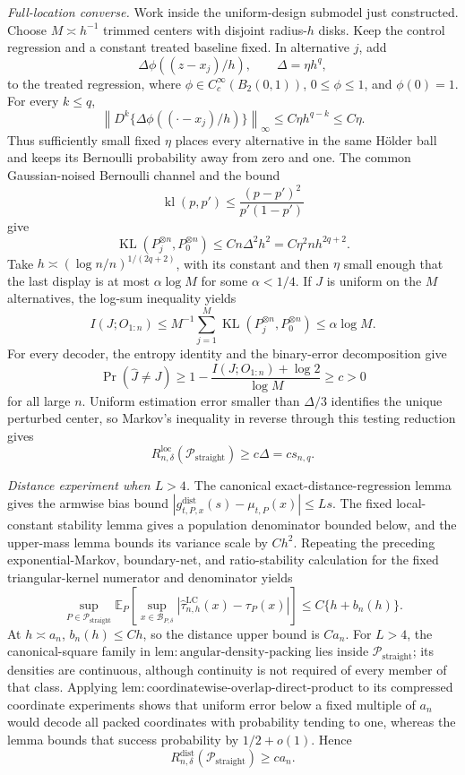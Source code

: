 \emph{Full-location converse.}  Work inside the uniform-design submodel just constructed.  Choose \(M\asymp h^{-1}\) trimmed centers with disjoint radius-\(h\) disks.  Keep the control regression and a constant treated baseline fixed.  In alternative \(j\), add
\[
 \Delta\phi((z-x_j)/h),
 \qquad \Delta=\eta h^q,
\]
to the treated regression, where \(\phi\in C_c^\infty(B_2(0,1))\), \(0\leq\phi\leq1\), and \(\phi(0)=1\).  For every \(k\leq q\),
\[
 \left\|D^k\{\Delta\phi((\cdot-x_j)/h)\}\right\|_\infty
 \leq C\eta h^{q-k}\leq C\eta.
\]
Thus sufficiently small fixed \(\eta\) places every alternative in the same H\"older ball and keeps its Bernoulli probability away from zero and one.  The common Gaussian-noised Bernoulli channel and the bound
\[
 \operatorname{kl}(p,p')\leq\frac{(p-p')^2}{p'(1-p')}
\]
give
\[
 \operatorname{KL}(P_j^{\otimes n},P_0^{\otimes n})
 \leq Cn\Delta^2h^2=C\eta^2nh^{2q+2}.
\]
Take \(h\asymp(\log n/n)^{1/(2q+2)}\), with its constant and then \(\eta\) small enough that the last display is at most \(\alpha\log M\) for some \(\alpha<1/4\).  If \(J\) is uniform on the \(M\) alternatives, the log-sum inequality yields
\[
 I(J;O_{1:n})\leq M^{-1}\sum_{j=1}^M
 \operatorname{KL}(P_j^{\otimes n},P_0^{\otimes n})
 \leq\alpha\log M.
\]
For every decoder, the entropy identity and the binary-error decomposition give
\[
 \Pr(\widehat J\neq J)
 \geq1-\frac{I(J;O_{1:n})+\log2}{\log M}
 \geq c>0
\]
for all large \(n\).  Uniform estimation error smaller than \(\Delta/3\) identifies the unique perturbed center, so Markov's inequality in reverse through this testing reduction gives
\[
 R_{n,\delta}^{\mathrm{loc}}(\mathcal P_{\mathrm{straight}})
 \geq c\Delta=cs_{n,q}.
\]

\emph{Distance experiment when \(L>4\).}  The canonical exact-distance-regression lemma gives the armwise bias bound \(|g^{\mathrm{dist}}_{t,P,x}(s)-\mu_{t,P}(x)|\leq Ls\).  The fixed local-constant stability lemma gives a population denominator bounded below, and the upper-mass lemma bounds its variance scale by \(Ch^2\).  Repeating the preceding exponential-Markov, boundary-net, and ratio-stability calculation for the fixed triangular-kernel numerator and denominator yields
\[
 \sup_{P\in\mathcal P_{\mathrm{straight}}}
 \mathbb E_P\!\left[
 \sup_{x\in\mathcal B_{P,\delta}}
 |\widehat\tau^{\mathrm{LC}}_{n,h}(x)-\tau_P(x)|
 \right]
 \leq C\{h+b_n(h)\}.
\]
At \(h\asymp a_n\), \(b_n(h)\leq Ch\), so the distance upper bound is \(Ca_n\).  For \(L>4\), the canonical-square family in \(\mathrm{lem:angular\text{-}density\text{-}packing}\) lies inside \(\mathcal P_{\mathrm{straight}}\); its densities are continuous, although continuity is not required of every member of that class.  Applying \(\mathrm{lem:coordinatewise\text{-}overlap\text{-}direct\text{-}product}\) to its compressed coordinate experiments shows that uniform error below a fixed multiple of \(a_n\) would decode all packed coordinates with probability tending to one, whereas the lemma bounds that success probability by \(1/2+o(1)\).  Hence
\[
 R_{n,\delta}^{\mathrm{dist}}(\mathcal P_{\mathrm{straight}})
 \geq ca_n.
\]

